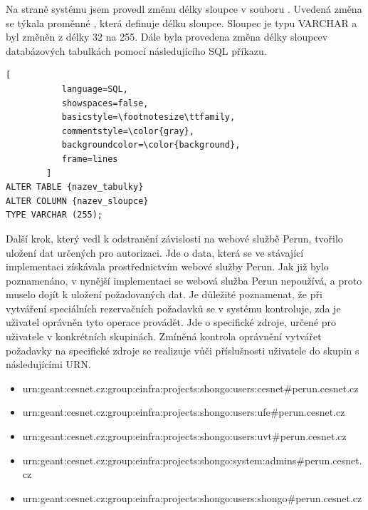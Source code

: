 \documentclass[
  printed, %
  twoside, %
  table,   %
  nolof,     %
  nolot,     %
]{fithesis3}
\begin{document}
\par  

Na straně systému  jsem provedl změnu délky sloupce v souboru . Uvedená změna se týkala proměnné , která definuje délku sloupce. Sloupec je typu VARCHAR a byl změněn z délky 32 na 255. Dále byla provedena změna délky sloupce\break v databázových tabulkách pomocí následujícího SQL příkazu.

\begin{lstlisting}[
           language=SQL,
           showspaces=false,
           basicstyle=\footnotesize\ttfamily,
           commentstyle=\color{gray},
           backgroundcolor=\color{background},
           frame=lines
        ]
ALTER TABLE {nazev_tabulky}  
ALTER COLUMN {nazev_sloupce}
TYPE VARCHAR (255);
\end{lstlisting}

\par

Další krok, který vedl k odstranění závislosti na webové službě Perun, tvořilo uložení dat určených pro autorizaci. Jde o data, která se ve stávající implementaci získávala prostřednictvím webové služby Perun. Jak již bylo poznamenáno, v nynější implementaci se webová služba Perun nepoužívá, a proto muselo dojít k uložení požadovaných dat. Je důležité poznamenat, že při vytváření speciálních rezervačních požadavků se v systému  kontroluje, zda je uživatel oprávněn tyto operace provádět. Jde o specifické zdroje, určené pro uživatele v konkrétních skupinách. Zmíněná kontrola oprávnění vytvářet požadavky na specifické zdroje se realizuje vůči příslušnosti uživatele do skupin s následujícími URN. 
\begin{itemize}
    \item urn:geant:cesnet.cz:group:einfra:projects:shongo:users:\linebreak cesnet\#perun.cesnet.cz
    \item urn:geant:cesnet.cz:group:einfra:projects:shongo:users:\linebreak ufe\#perun.cesnet.cz
    \item urn:geant:cesnet.cz:group:einfra:projects:shongo:users:\linebreak uvt\#perun.cesnet.cz
    \item urn:geant:cesnet.cz:group:einfra:projects:shongo:system:\linebreak admins\#perun.cesnet.cz
    \item urn:geant:cesnet.cz:group:einfra:projects:shongo:users:\linebreak shongo\#perun.cesnet.cz
\end{itemize}
\end{document}
